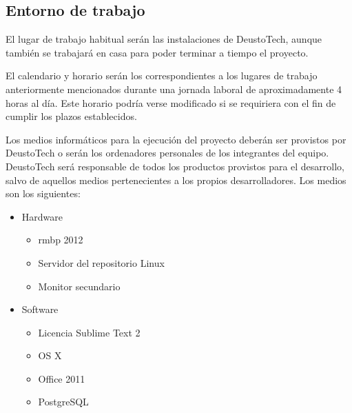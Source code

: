\subsection{Entorno de trabajo}

El lugar de trabajo habitual serán las instalaciones de DeustoTech, aunque también se trabajará en casa para poder terminar a tiempo el proyecto.

El calendario y horario serán los correspondientes a los lugares de trabajo anteriormente mencionados durante una jornada laboral de aproximadamente 4 horas al día. Este horario podría verse modificado si se requiriera con el fin de cumplir los plazos establecidos.

Los medios informáticos para la ejecución del proyecto deberán ser provistos por DeustoTech o serán los ordenadores personales de los integrantes del equipo. DeustoTech será responsable de todos los productos provistos para el desarrollo, salvo de aquellos medios pertenecientes a los propios desarrolladores. Los medios son los siguientes: 

\begin{itemize}
	\item Hardware
	\begin{itemize}
		\item \acrlong{rmbp} 2012
		\item Servidor del repositorio Linux
		\item Monitor secundario
	\end{itemize}
	\item Software
	\begin{itemize}
		\item Licencia Sublime Text 2
		\item OS X
		\item Office 2011
		\item PostgreSQL
	\end{itemize}
\end{itemize}